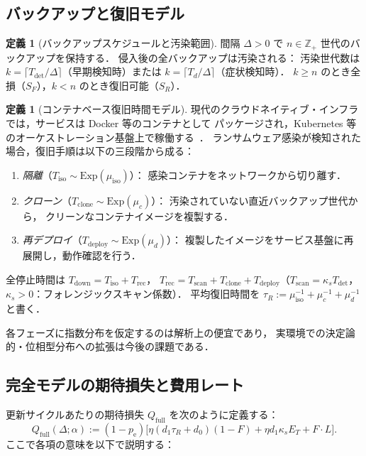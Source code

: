 \documentclass[12pt,a4paper]{article}
\theoremstyle{plain}
\theoremstyle{definition}
\newtheorem{definition}[theorem]{定義}
\theoremstyle{remark}
\newcommand{\Z}{\mathbb{Z}}
\newcommand{\pe}{p_{\mathrm{e}}}
\newcommand{\Qf}{Q_{\mathrm{full}}}
\newcommand{\Tdet}{T_{\mathrm{det}}}
\newcommand{\Trec}{T_{\mathrm{rec}}}
\newcommand{\Tdown}{T_{\mathrm{down}}}
\begin{document}
\subsection{バックアップと復旧モデル}

\begin{definition}[バックアップスケジュールと汚染範囲]\label{def:backup}
間隔 $\Delta>0$ で $n\in\Z_+$ 世代のバックアップを保持する．
侵入後の全バックアップは汚染される：
汚染世代数は $k=\lceil\Tdet/\Delta\rceil$（早期検知時）または $k=\lceil T_d/\Delta\rceil$（症状検知時）．
$k\ge n$ のとき全損（$S_F$），$k<n$ のとき復旧可能（$S_R$）．
\end{definition}

\begin{definition}[コンテナベース復旧時間モデル]\label{def:recovery}
現代のクラウドネイティブ・インフラでは，サービスは Docker 等のコンテナとして
パッケージされ，Kubernetes 等のオーケストレーション基盤上で稼働する~\cite{nist80034,cisa2020}．
ランサムウェア感染が検知された場合，復旧手順は以下の三段階から成る：
\begin{enumerate}[leftmargin=2em,label=(\roman*)]
  \item \emph{隔離}（$T_{\mathrm{iso}}\sim\mathrm{Exp}(\mu_{\mathrm{iso}})$）：
    感染コンテナをネットワークから切り離す．
  \item \emph{クローン}（$T_{\mathrm{clone}}\sim\mathrm{Exp}(\mu_c)$）：
    汚染されていない直近バックアップ世代から，
    クリーンなコンテナイメージを複製する．
  \item \emph{再デプロイ}（$T_{\mathrm{deploy}}\sim\mathrm{Exp}(\mu_d)$）：
    複製したイメージをサービス基盤に再展開し，動作確認を行う．
\end{enumerate}
全停止時間は $\Tdown=T_{\mathrm{iso}}+\Trec$，
$\Trec=T_{\mathrm{scan}}+T_{\mathrm{clone}}+T_{\mathrm{deploy}}$（$T_{\mathrm{scan}}=\kappa_s\Tdet$，$\kappa_s>0$：フォレンジックスキャン係数）．
平均復旧時間を $\tau_R:=\mu_{\mathrm{iso}}^{-1}+\mu_c^{-1}+\mu_d^{-1}$ と書く．

各フェーズに指数分布を仮定するのは解析上の便宜であり，
実環境での決定論的・位相型分布への拡張は今後の課題である．
\end{definition}

\subsection{完全モデルの期待損失と費用レート}

更新サイクルあたりの期待損失 $\Qf$ を次のように定義する：
\begin{equation}\label{eq:Qfull}
\boxed{
\Qf(\Delta;\alpha)
:=(1-\pe)\bigl[\eta(d_1\tau_R+d_0)(1-F)+\eta d_1\kappa_s E_T+F\cdot L\bigr].
}
\end{equation}
ここで各項の意味を以下で説明する：
\end{document}
